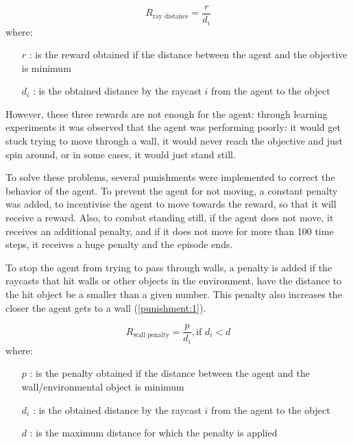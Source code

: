 \begin{equation} \label{reward:2}
    R_\text{ray distance} = \frac{r}{d_{i}}
\end{equation}
where:
\begin{itemize}
    \item [$r$]: is the reward obtained if the distance between the agent and the objective is minimum
    \item [$d_{i}$]: is the obtained distance by the raycast $i$ from the agent to the object
\end{itemize}

However, these three rewards are not enough for the agent: through learning experiments it was observed that the agent was performing poorly: it would get stuck trying to move through a wall, it would never reach the objective and just spin around, or in some cases, it would just stand still.

To solve these problems, several punishments were implemented to correct the behavior of the agent. To prevent the agent for not moving, a constant penalty was added, to incentivise the agent to move towards the reward, so that it will receive a reward. Also, to combat standing still, if the agent does not move, it receives an additional penalty, and if it does not move for more than 100 time steps, it receives a huge penalty and the episode ends. 

To stop the agent from trying to pass through walls, a penalty is added if the raycasts that hit walls or other objects in the environment, have the distance to the hit object be a smaller than a given number. This penalty also increases the closer the agent gets to a wall (\ref{punishment:1}). 

\begin{equation} \label{punishment:1}
    R_\text{wall penalty} = \frac{p}{d_{i}}, \text{if } d_{i} < d
\end{equation}
where:
\begin{itemize}
    \item [$p$]: is the penalty obtained if the distance between the agent and the wall/environmental object is minimum
    \item [$d_{i}$]: is the obtained distance by the raycast $i$ from the agent to the object
    \item [$d$]: is the maximum distance for which the penalty is applied
\end{itemize}

